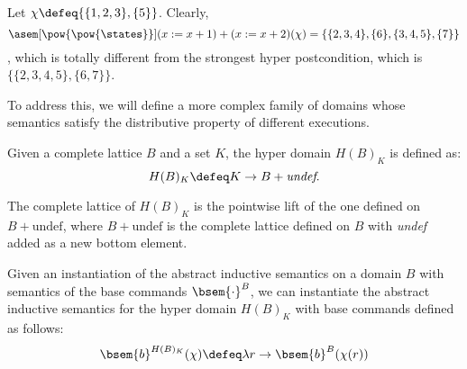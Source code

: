 \begin{example}
  Let $\chi \defeq \{\{1, 2, 3\}, \{5\}\}$. Clearly,
  $$\asem[\pow{\pow{\states}}]{(x := x + 1) + (x := x + 2)}(\chi) = 
  \{\{2, 3, 4\}, \{6\}, \{3, 4, 5\}, \{7\}\}$$,
  which is totally different from the strongest hyper postcondition, 
  which is $\{\{2, 3, 4, 5\}, \{6, 7\}\}$.
\end{example}

To address this, we will define a more complex family of domains whose semantics 
satisfy the distributive property of different executions.

\begin{definition}
  Given a complete lattice $B$ and a set $K$, the hyper domain $H(B)_K$ is 
  defined as:
  $$H(B)_K \defeq K \to B + \textit{undef}.$$

  The complete lattice of $H(B)_K$ is the pointwise lift of the one defined on 
  $B + \text{undef}$, where $B + \text{undef}$ is the complete lattice defined 
  on $B$ with \textit{undef} added as a new bottom element.
\end{definition}

\begin{definition}
  Given an instantiation of the abstract inductive semantics on a domain $B$ 
  with semantics of the base commands $\bsem{\cdot}^B$, we can instantiate the 
  abstract inductive semantics for the hyper domain $H(B)_K$ with base 
  commands defined as follows:
  $$\bsem{b}^{H(B)_K}(\chi) \defeq \lambda r \to \bsem{b}^B(\chi(r))$$
\end{definition}
